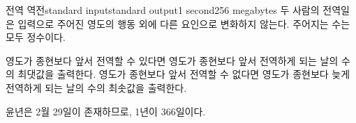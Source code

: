 \begin{problem}{전역 역전}{standard input}{standard output}{1 second}{256 megabytes}
두 사람의 전역일은 입력으로 주어진 영도의 행동 외에 다른 요인으로 변화하지 않는다. 주어지는 수는 모두 정수이다.

\OutputFile
영도가 종현보다 앞서 전역할 수 있다면 영도가 종현보다 앞서 전역하게 되는 날의 수의 최댓값을 출력한다.
영도가 종현보다 앞서 전역할 수 없다면 영도가 종현보다 늦게 전역하게 되는 날의 수의 최솟값을 출력한다.

\Examples

\begin{example}
%
%
\end{example}

\Note
윤년은 2월 29일이 존재하므로, 1년이 366일이다.

\end{problem}

